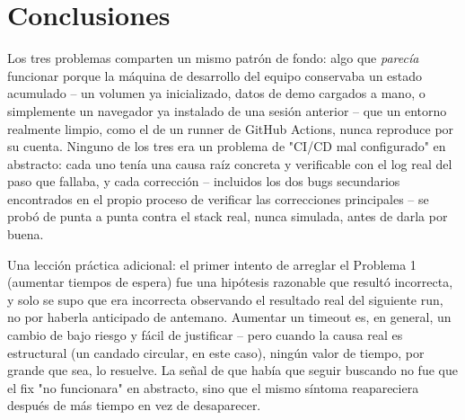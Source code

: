 \documentclass[11pt,letterpaper]{article}
\begin{document}
\section{Conclusiones}

Los tres problemas comparten un mismo patrón de fondo: algo que \emph{parecía} funcionar porque
la máquina de desarrollo del equipo conservaba un estado acumulado -- un volumen ya inicializado,
datos de demo cargados a mano, o simplemente un navegador ya instalado de una sesión anterior --
que un entorno realmente limpio, como el de un runner de GitHub Actions, nunca reproduce por su
cuenta. Ninguno de los tres era un problema de "CI/CD mal configurado" en abstracto: cada uno
tenía una causa raíz concreta y verificable con el log real del paso que fallaba, y cada
corrección -- incluidos los dos bugs secundarios encontrados en el propio proceso de verificar
las correcciones principales -- se probó de punta a punta contra el stack real, nunca simulada,
antes de darla por buena.

Una lección práctica adicional: el primer intento de arreglar el Problema 1 (aumentar tiempos de
espera) fue una hipótesis razonable que resultó incorrecta, y solo se supo que era incorrecta
observando el resultado real del siguiente run, no por haberla anticipado de antemano. Aumentar
un timeout es, en general, un cambio de bajo riesgo y fácil de justificar -- pero cuando la causa
real es estructural (un candado circular, en este caso), ningún valor de tiempo, por grande que
sea, lo resuelve. La señal de que había que seguir buscando no fue que el fix "no funcionara" en
abstracto, sino que el mismo síntoma reapareciera después de más tiempo en vez de desaparecer.
\end{document}

